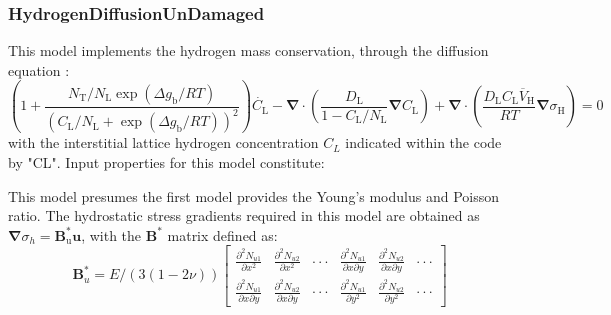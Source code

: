 \documentclass[3p]{elsarticle} %
\begin{document}
\subsubsection{HydrogenDiffusionUnDamaged}
\label{sec:hyd_undamaged}
This model implements the hydrogen mass conservation, through the diffusion equation \citep{Oriani1974, Martinez-Paneda2020, Kristensen2020a, Golahmar2021, Hageman2022}:
\begin{equation}
    \left( 1+\frac{N_\mathrm{T}/N_\mathrm{L} \exp\left(\Delta g_\mathrm{b}/RT\right)}{\left(C_\mathrm{L}/N_\mathrm{L}+\exp\left(\Delta g_\mathrm{b}/RT\right)\right)^2}\right) \dot{C_\mathrm{L}}-\bm{\nabla}\cdot\left(\frac{D_\mathrm{L}}{1-C_\mathrm{L}/N_\mathrm{L}}\bm{\nabla} C_\mathrm{L}\right) + \bm{\nabla} \cdot \left( \frac{D_\mathrm{L} C_\mathrm{L} \overline{V}_\mathrm{H}}{RT}\bm{\nabla}\sigma_\mathrm{H} \right) = 0 \label{eq:hyd_diff}
\end{equation}
with the interstitial lattice hydrogen concentration $C_L$ indicated within the code by "CL". Input properties for this model constitute:

This model presumes the first model provides the Young's modulus and Poisson ratio. The hydrostatic stress gradients required in this model are obtained as $\bm{\nabla}\sigma_h=\bm{B}_\mathrm{u}^*\mathbf{u}$, with the $\bm{B}^*$ matrix defined as:
\begin{equation}
    \bm{B}_u^* = E/(3(1-2\nu))
    \begin{bmatrix} \frac{\partial^2 N_{u1}}{\partial x^2} & \frac{\partial^2 N_{u2}}{\partial x^2} & \cdot\cdot\cdot & \frac{\partial^2 N_{u1}}{\partial x\partial y} & \frac{\partial^2 N_{u2}}{\partial x\partial y} & \cdot \cdot \cdot \\
    \frac{\partial^2 N_{u1}}{\partial x\partial y} & \frac{\partial^2 N_{u2}}{\partial x \partial y} & \cdot\cdot\cdot & \frac{\partial^2 N_{u1}}{\partial y^2} & \frac{\partial^2 N_{u2}}{\partial y^2} & \cdot \cdot \cdot
    \end{bmatrix}
\end{equation}
\end{document}
